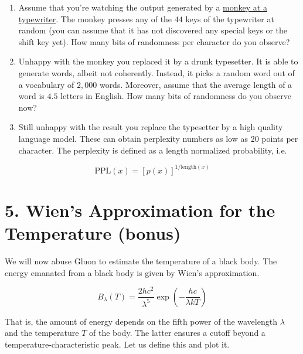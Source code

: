 \documentclass[11pt]{article}
\providecommand{\tightlist}{%
      \setlength{\itemsep}{0pt}\setlength{\parskip}{0pt}}
\begin{document}
\begin{enumerate}
\def\labelenumi{\arabic{enumi}.}
\tightlist
\item
  Assume that you're watching the output generated by a
  \href{https://en.wikipedia.org/wiki/File:Chimpanzee_seated_at_typewriter.jpg}{monkey
  at a typewriter}. The monkey presses any of the \(44\) keys of the
  typewriter at random (you can assume that it has not discovered any
  special keys or the shift key yet). How many bits of randomness per
  character do you observe?
\item
  Unhappy with the monkey you replaced it by a drunk typesetter. It is
  able to generate words, albeit not coherently. Instead, it picks a
  random word out of a vocabulary of \(2,000\) words. Moreover, assume
  that the average length of a word is \(4.5\) letters in English. How
  many bits of randomness do you observe now?
\item
  Still unhappy with the result you replace the typesetter by a high
  quality language model. These can obtain perplexity numbers as low as
  20 points per character. The perplexity is defined as a length
  normalized probability, i.e.
\end{enumerate}

\[\mathrm{PPL}(x) = \left[p(x)\right]^{1/\mathrm{length}(x)}\]

    \hypertarget{wiens-approximation-for-the-temperature-bonus}{%
\section{5. Wien's Approximation for the Temperature
(bonus)}\label{wiens-approximation-for-the-temperature-bonus}}

We will now abuse Gluon to estimate the temperature of a black body. The
energy emanated from a black body is given by Wien's approximation.

\[B_\lambda(T) = \frac{2 h c^2}{\lambda^5} \exp\left(-\frac{h c}{\lambda k T}\right)\]

That is, the amount of energy depends on the fifth power of the
wavelength \(\lambda\) and the temperature \(T\) of the body. The latter
ensures a cutoff beyond a temperature-characteristic peak. Let us define
this and plot it.
\end{document}
